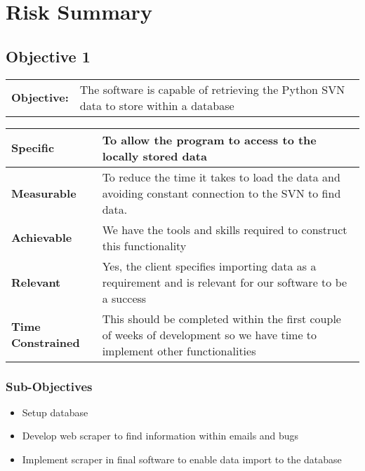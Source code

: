 
\chapter{Risk Summary} %

\label{PartChapter2} %


\section{Objective 1}

\begin{table}[H]
    \begin{tabularx}{\textwidth}{| l | X |}
        \hline
        \textbf{Objective:} & The software is capable of retrieving the Python SVN data to store within a database \\
    \end{tabularx}
    \begin{tabularx}{\textwidth}{| l | X |}
        \hline
        \textbf{Specific} & To allow the program to access to the locally stored data\\ \hline
        \textbf{Measurable} & To reduce the time it takes to load the data and avoiding constant connection to the SVN to find data. \\ \hline
        \textbf{Achievable} &  We have the tools and skills required to construct this functionality\\ \hline
        \textbf{Relevant} & Yes, the client specifies importing data as a requirement and is relevant for our software to be a success  \\ \hline
        \textbf{Time Constrained} & This should be completed within the first couple of weeks of development so we have time to implement other functionalities \\ \hline
    \end{tabularx}
\end{table}
\subsection{Sub-Objectives}

	\begin{itemize}
		\item Setup database
		\item Develop web scraper to find information within emails and bugs
		\item Implement scraper in final software to enable data import to the database
	\end{itemize}

